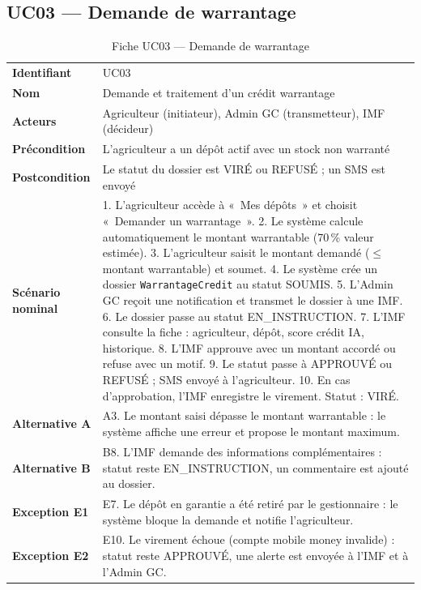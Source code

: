 \documentclass[12pt,a4paper,twoside]{report}
\begin{document}
\subsection{UC03 --- Demande de warrantage}

\begin{table}[H]
\centering
\caption{Fiche UC03 --- Demande de warrantage}
\label{tab:uc03}
\begin{tabular}{L{3.5cm}L{10cm}}
\toprule
\textbf{Identifiant}   & UC03 \\
\textbf{Nom}           & Demande et traitement d'un crédit warrantage \\
\textbf{Acteurs}       & Agriculteur (initiateur), Admin GC (transmetteur), IMF (décideur) \\
\textbf{Précondition}  & L'agriculteur a un dépôt actif avec un stock non warranté \\
\textbf{Postcondition} & Le statut du dossier est VIRÉ ou REFUSÉ ; un SMS est envoyé \\
\midrule
\textbf{Scénario nominal} &
  1. L'agriculteur accède à «~Mes dépôts~» et choisit «~Demander un warrantage~».
  2. Le système calcule automatiquement le montant warrantable (70\,\% valeur estimée).
  3. L'agriculteur saisit le montant demandé ($\leq$ montant warrantable) et soumet.
  4. Le système crée un dossier \texttt{WarrantageCredit} au statut SOUMIS.
  5. L'Admin GC reçoit une notification et transmet le dossier à une IMF.
  6. Le dossier passe au statut EN\_INSTRUCTION.
  7. L'IMF consulte la fiche : agriculteur, dépôt, score crédit IA, historique.
  8. L'IMF approuve avec un montant accordé ou refuse avec un motif.
  9. Le statut passe à APPROUVÉ ou REFUSÉ ; SMS envoyé à l'agriculteur.
  10. En cas d'approbation, l'IMF enregistre le virement. Statut : VIRÉ. \\
\midrule
\textbf{Alternative A} &
  A3. Le montant saisi dépasse le montant warrantable : le système affiche une erreur
  et propose le montant maximum. \\
\textbf{Alternative B} &
  B8. L'IMF demande des informations complémentaires : statut reste EN\_INSTRUCTION,
  un commentaire est ajouté au dossier. \\
\textbf{Exception E1}  &
  E7. Le dépôt en garantie a été retiré par le gestionnaire : le système bloque la
  demande et notifie l'agriculteur. \\
\textbf{Exception E2}  &
  E10. Le virement échoue (compte mobile money invalide) : statut reste APPROUVÉ,
  une alerte est envoyée à l'IMF et à l'Admin GC. \\
\bottomrule
\end{tabular}
\end{table}
\end{document}
